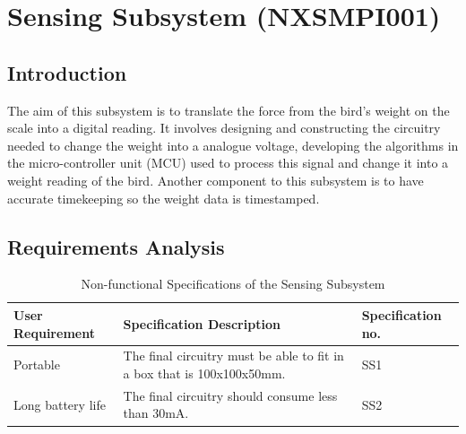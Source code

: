 \documentclass[class=report,11pt,crop=false]{standalone}
\begin{document}
	\chapter{Sensing Subsystem (NXSMPI001)}
	\vspace{0.5cm}
	\section{Introduction}
	The aim of this subsystem is to translate the force from the bird's weight on the scale into a digital reading. It involves designing and constructing the circuitry needed to change the weight into a analogue voltage, developing the algorithms in the micro-controller unit (MCU) used to process this signal and change it into a weight reading of the bird. Another component to this subsystem is to have accurate timekeeping so the weight data is timestamped. 
	
	\section{Requirements Analysis}
	\begin{table}[h!]
		\centering
		\caption{Non-functional Specifications of the Sensing Subsystem}
		\label{tab:S1}
			\begin{tabularx}{0.8\textwidth}{ 
					| >{\centering\arraybackslash}X 
					| >{\centering\arraybackslash}X 
					| >{\centering\arraybackslash}X |}
			\hline
			\textbf{User   Requirement} & \textbf{Specification   Description}                                     & \textbf{Specification   no.} \\ \hline
			Portable                    & The final   circuitry must be able to fit in a box that is 100x100x50mm. & SS1                          \\ \hline
			Long battery   life         & The final   circuitry should consume less than 30mA.                     & SS2                          \\ \hline
			\end{tabularx}
	\end{table}
	
\end{document}
